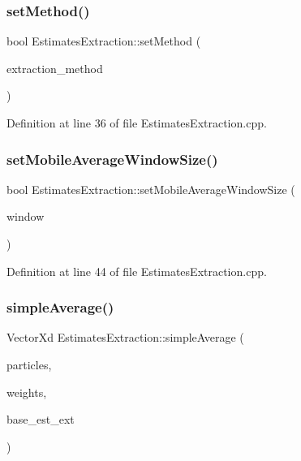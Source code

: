 \subsubsection{\texorpdfstring{set\+Method()}{setMethod()}}
{\footnotesize\ttfamily bool Estimates\+Extraction\+::set\+Method (\begin{DoxyParamCaption}\item[{const \mbox{\hyperlink{classbfl_1_1EstimatesExtraction_a8489976af4025f0bbc3288ff7f17ffb0}{Extraction\+Method}} \&}]{extraction\+\_\+method }\end{DoxyParamCaption})}



Definition at line 36 of file Estimates\+Extraction.\+cpp.

\mbox{\label{classbfl_1_1EstimatesExtraction_a49babb0803c50d697b8d21014010f5bb}} 
\subsubsection{\texorpdfstring{set\+Mobile\+Average\+Window\+Size()}{setMobileAverageWindowSize()}}
{\footnotesize\ttfamily bool Estimates\+Extraction\+::set\+Mobile\+Average\+Window\+Size (\begin{DoxyParamCaption}\item[{const int}]{window }\end{DoxyParamCaption})}



Definition at line 44 of file Estimates\+Extraction.\+cpp.

\mbox{\label{classbfl_1_1EstimatesExtraction_a443e7df78f1c5fa0967afcb64109ca3b}} 
\subsubsection{\texorpdfstring{simple\+Average()}{simpleAverage()}}
{\footnotesize\ttfamily Vector\+Xd Estimates\+Extraction\+::simple\+Average (\begin{DoxyParamCaption}\item[{const Eigen\+::\+Ref$<$ const Eigen\+::\+Matrix\+Xd $>$ \&}]{particles,  }\item[{const Eigen\+::\+Ref$<$ const Eigen\+::\+Vector\+Xd $>$ \&}]{weights,  }\item[{const \mbox{\hyperlink{classbfl_1_1EstimatesExtraction_a8c0593a43166c569530947107c830462}{Statistics}} \&}]{base\+\_\+est\+\_\+ext }\end{DoxyParamCaption})\hspace{0.3cm}{\ttfamily [protected]}}



